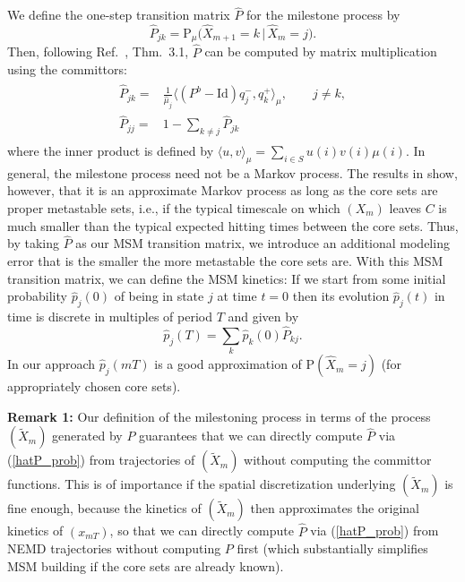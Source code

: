 \documentclass[journal=jctcce,manuscript=article]{achemso}
\newcommand{\vect}[1]{#1}
\newcommand{\fwd}[0]{+}
\newcommand{\bwd}[0]{-}
\newcommand{\id}{\mathrm{Id}}
\newcommand{\prob}{\textrm{P}}
\begin{document}
We define the one-step transition matrix $\hat{\vect P}$ for the milestone process by
\begin{equation}\label{hatP_prob}
\hat{\vect P}_{jk}=\prob_\mu\Big(\hat{X}_{m+1}=k\,\vert\, \hat{X}_m=j\Big).
\end{equation}
Then, following
Ref.~\cite{djurdjevac2010markov}, Thm.~3.1, 
$\hat{\vect P}$ can be computed by matrix multiplication using the committors:
  \begin{align}
    \label{eq:msm-tmatrix-00}
    \begin{split}      
    \hat{\vect P}_{jk}
    = &
    \frac{1}{\hat{\mu}_j}
    \langle (\vect P^b - \id) q^\bwd_j,q^\fwd_k \rangle_\mu,\qquad j\not= k, \\    %
    \hat{\vect P}_{jj}
    =&
    1-\sum_{k\not=j} \hat{\vect P}_{jk}
    \end{split}
  \end{align}
where the inner product is defined by
$\langle u,v \rangle_\mu=\sum_{i\in S} u(i) v(i) \mu(i)$. 
In general, the milestone process need not be a Markov process. The results in \cite{A19-31,sarich2014utilizing} show, however, that it is an approximate Markov process as long as the core sets are proper metastable sets, i.e., if the typical timescale on which $(X_m)$ leaves $C$ is much smaller than the typical expected hitting times between the core sets.
Thus, by taking $\hat{P}$ as our MSM transition matrix, we introduce an additional modeling error that is the smaller the more metastable the core sets are.
With this MSM transition matrix, we can define the MSM kinetics:
If we start from some initial probability $\hat{p}_j(0)$ of being in state $j$ at time $t=0$ then its evolution $\hat{p}_j(t)$ in time is discrete in multiples of period $T$ and given by
\begin{equation}\label{eq:num-29}
\hat{p}_j(T)=\sum_k \hat{p}_k(0)\hat{\vect P}_{kj}.
\end{equation}
In our approach $\hat p_j(mT)$ is a good approximation of $\prob(\hat{X}_m=j)$ (for appropriately chosen core sets).

\textbf{Remark 1:} Our definition of the milestoning process in terms of the process $(\tilde X_m)$ generated by $P$ guarantees that we can directly compute $\hat{P}$ via (\ref{hatP_prob})  from trajectories of $(\tilde X_m)$ without computing the committor functions. 
This is of importance if the spatial discretization underlying $(\tilde X_m)$ is fine enough, because the kinetics of $(\tilde X_m)$
then approximates the original kinetics of $(x_{mT})$, so that we can directly compute   $\hat{P}$ via (\ref{hatP_prob})  from NEMD trajectories without computing $P$ first (which substantially simplifies MSM building if the core sets are already known).
\end{document}
